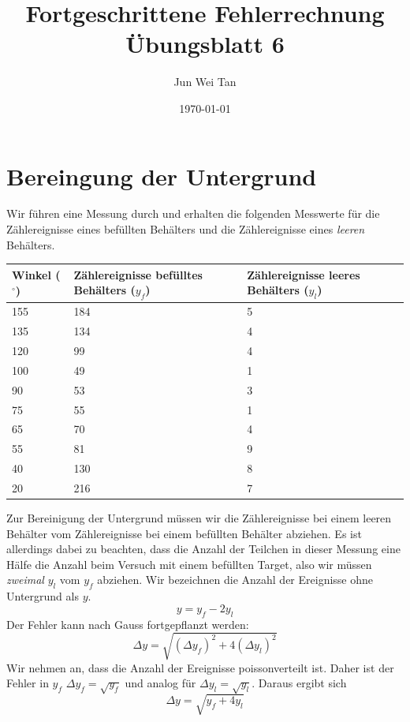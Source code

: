 \documentclass[prb,12pt]{revtex4-2}
\theoremstyle{definition}
\theoremstyle{definition}
\begin{document}
\title{Fortgeschrittene Fehlerrechnung Übungsblatt 6}
	\author{Jun Wei Tan}
	\date{\today}
	\maketitle

\section{Bereingung der Untergrund}
Wir führen eine Messung durch und erhalten die folgenden Messwerte für die Zählereignisse eines befüllten Behälters und die Zählereignisse eines \emph{leeren} Behälters.

\setlength{\tabcolsep}{12pt}

\begin{center}
	\begin{tabular}{p{3cm}p{5cm}p{5cm}}
		\toprule
		\textbf{Winkel ($^\circ$)} & \textbf{Zählereignisse befülltes Behälters ($y_f$)} & \textbf{Zählereignisse leeres Behälters ($y_l$)}\\\midrule
		 155 & 184 & 5 \\\midrule
		135 & 134 & 4 \\\midrule
		120 & 99 & 4 \\\midrule
		100 & 49 & 1 \\\midrule
		90 & 53 & 3 \\\midrule
		75 & 55 & 1 \\\midrule
		65 & 70 & 4 \\\midrule
		55 & 81 & 9 \\\midrule
		40 & 130 & 8 \\\midrule
		20 & 216 & 7 \\\bottomrule
	\end{tabular}
\end{center}

Zur Bereinigung der Untergrund müssen wir die Zählereignisse bei einem leeren Behälter vom Zählereignisse bei einem befüllten Behälter abziehen. Es ist allerdings dabei zu beachten, dass die Anzahl der Teilchen in dieser Messung eine Hälfe die Anzahl beim Versuch mit einem befüllten Target, also wir müssen \emph{zweimal} $y_l$ vom $y_f$ abziehen. Wir bezeichnen die Anzahl der Ereignisse ohne Untergrund als $y$.
\begin{equation}
	y=y_f-2y_l
\end{equation}
Der Fehler kann nach Gauss fortgepflanzt werden:
\[\Delta y = \sqrt{(\Delta y_f)^2 + 4(\Delta y_l)^2}\]
	Wir nehmen an, dass die Anzahl der Ereignisse poissonverteilt ist. Daher ist der Fehler in $y_f$ $\Delta y_f=\sqrt{y_f}$ und analog f\"{u}r $\Delta y_l=\sqrt{y_l}$. Daraus ergibt sich
	\begin{equation}
		\Delta y = \sqrt{y_f+4 y_l}
	\end{equation}
\end{document}

